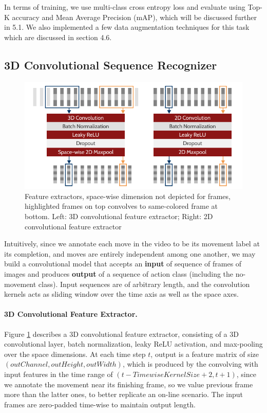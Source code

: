 \documentclass[10pt,twocolumn,letterpaper]{article}
\begin{document}
In terms of training, we use multi-class cross entropy loss and evaluate using Top-K accuracy and Mean Average Precision (mAP), which will be discussed further in 5.1. We also implemented a few data augmentation techniques for this task which are discussed in section 4.6. 

\subsection{3D Convolutional Sequence Recognizer}

\begin{figure}[]
    \centering
    \includegraphics[scale=0.33]{3d-conv-clf.png}
    \caption{Feature extractors, space-wise dimension not depicted for frames, highlighted frames on top convolves to same-colored frame at bottom. Left: 3D convolutional feature extractor; Right: 2D convolutional feature extractor}
    \label{fig:3dconv}
\end{figure}



Intuitively, since we annotate each move in the video to be its movement label at its completion, and moves are entirely independent among one another, we may build a convolutional model that accepts an \textbf{input} of sequence of frames of images and produces \textbf{output} of a sequence of action class (including the no-movement class). Input sequences are of arbitrary length, and the convolution kernels acts as sliding window over the time axis as well as the space axes. 

\paragraph{3D Convolutional Feature Extractor.}

Figure \ref{fig:3dconv} describes a 3D convolutional feature extractor, consisting of a 3D convolutional layer, batch normalization, leaky ReLU activation, and max-pooling over the space dimensions. At each time step $t$, output is a feature matrix of size $(outChannel, outHeight, outWidth)$, which is produced by the convolving with input features in the time range of $(t-TimewiseKernelSize+2, t+1)$, since we annotate the movement near its finishing frame, so we value previous frame more than the latter ones, to better replicate an on-line scenario. The input frames are zero-padded time-wise to maintain output length.
\end{document}
